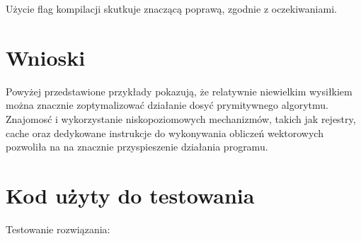 \documentclass{article}
\begin{document}
Użycie flag kompilacji skutkuje znaczącą poprawą, zgodnie z oczekiwaniami.

\section{Wnioski}

Powyżej przedstawione przykłady pokazują, że relatywnie niewielkim wysiłkiem można znacznie zoptymalizować
działanie dosyć prymitywnego algorytmu. Znajomosć i wykorzystanie niskopoziomowych mechanizmów, takich jak
rejestry, cache oraz dedykowane instrukcje do wykonywania obliczeń wektorowych pozwoliła na
na znacznie przyspieszenie działania programu.

\section{Kod użyty do testowania}

Testowanie rozwiązania:
\end{document}
